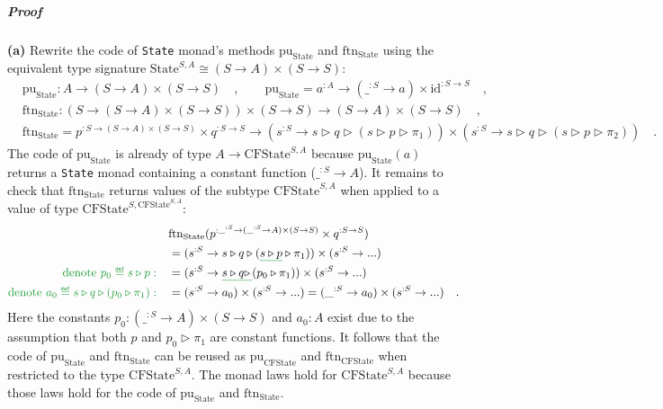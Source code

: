 \subparagraph{Proof}

\textbf{(a)} Rewrite the code of \lstinline!State! monad\textsf{'}s methods
$\text{pu}_{\text{State}}$ and $\text{ftn}_{\text{State}}$ using
the equivalent type signature $\text{State}^{S,A}\cong(S\rightarrow A)\times(S\rightarrow S)$:
\begin{align*}
 & \text{pu}_{\text{State}}:A\rightarrow(S\rightarrow A)\times(S\rightarrow S)\quad,\quad\quad\text{pu}_{\text{State}}=a^{:A}\rightarrow(\_^{:S}\rightarrow a)\times\text{id}^{:S\rightarrow S}\quad,\\
 & \text{ftn}_{\text{State}}:(S\rightarrow(S\rightarrow A)\times(S\rightarrow S))\times(S\rightarrow S)\rightarrow(S\rightarrow A)\times(S\rightarrow S)\quad,\\
 & \text{ftn}_{\text{State}}=p^{:S\rightarrow(S\rightarrow A)\times(S\rightarrow S)}\times q^{:S\rightarrow S}\rightarrow(s^{:S}\rightarrow s\triangleright q\triangleright(s\triangleright p\triangleright\pi_{1}))\times(s^{:S}\rightarrow s\triangleright q\triangleright(s\triangleright p\triangleright\pi_{2}))\quad.
\end{align*}
The code of $\text{pu}_{\text{State}}$ is already of type $A\rightarrow\text{CFState}^{S,A}$
because $\text{pu}_{\text{State}}(a)$ returns a \lstinline!State!
monad containing a constant function ($\_^{:S}\rightarrow A$). It
remains to check that $\text{ftn}_{\text{State}}$ returns values
of the subtype $\text{CFState}^{S,A}$ when applied to a value of
type $\text{CFState}^{S,\text{CFState}^{S,A}}$:
\begin{align*}
 & \text{ftn}_{\text{State}}(p^{:\_^{:S}\rightarrow(\_^{:S}\rightarrow A)\times(S\rightarrow S)}\times q^{:S\rightarrow S})\\
 & =(s^{:S}\rightarrow s\triangleright q\triangleright(\gunderline{s\triangleright p}\triangleright\pi_{1}))\times(s^{:S}\rightarrow...)\\
{\color{greenunder}\text{denote }p_{0}\triangleq s\triangleright p:}\quad & =(s^{:S}\rightarrow\gunderline{s\triangleright q\triangleright\,}(p_{0}\triangleright\pi_{1}))\times(s^{:S}\rightarrow...)\\
{\color{greenunder}\text{denote }a_{0}\triangleq s\triangleright q\triangleright(p_{0}\triangleright\pi_{1}):}\quad & =(s^{:S}\rightarrow a_{0})\times(s^{:S}\rightarrow...)=(\_^{:S}\rightarrow a_{0})\times(s^{:S}\rightarrow...)\quad.
\end{align*}
Here the constants $p_{0}:(\_^{:S}\rightarrow A)\times(S\rightarrow S)$
and $a_{0}:A$ exist due to the assumption that both $p$ and $p_{0}\triangleright\pi_{1}$
are constant functions. It follows that the code of $\text{pu}_{\text{State}}$
and $\text{ftn}_{\text{State}}$ can be reused as $\text{pu}_{\text{CFState}}$
and $\text{ftn}_{\text{CFState}}$ when restricted to the type $\text{CFState}^{S,A}$.
The monad laws hold for $\text{CFState}^{S,A}$ because those laws
hold for the code of $\text{pu}_{\text{State}}$ and $\text{ftn}_{\text{State}}$.


